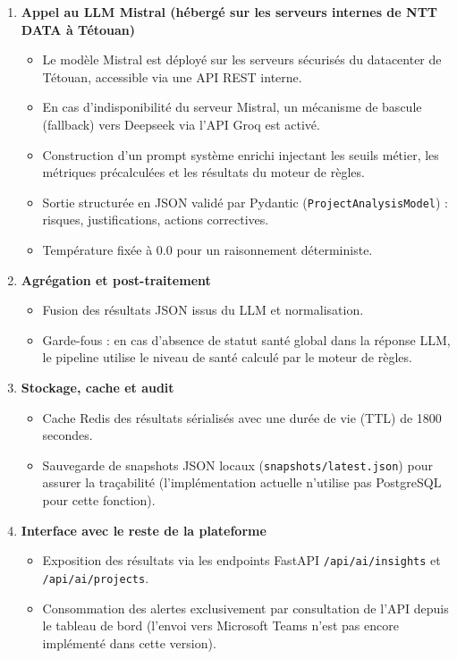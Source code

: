 \begin{enumerate}
    \item \textbf{Appel au LLM Mistral (hébergé sur les serveurs internes de NTT DATA à Tétouan)}
\begin{itemize}
    \renewcommand{\labelitemi}{—}
    \item Le modèle Mistral est déployé sur les serveurs sécurisés du datacenter de Tétouan, accessible via une API REST interne.
    \item En cas d’indisponibilité du serveur Mistral, un mécanisme de bascule (fallback) vers Deepseek via l’API Groq est activé.
    \item Construction d’un prompt système enrichi injectant les seuils métier, les métriques précalculées et les résultats du moteur de règles.
    \item Sortie structurée en JSON validé par Pydantic (\texttt{ProjectAnalysisModel}) : risques, justifications, actions correctives.
    \item Température fixée à $0.0$ pour un raisonnement déterministe.
\end{itemize}
    
    \item \textbf{Agrégation et post-traitement}
    \begin{itemize}
        \renewcommand{\labelitemi}{—}
        \item Fusion des résultats JSON issus du LLM et normalisation.
        \item Garde-fous : en cas d'absence de statut santé global dans la réponse LLM, le pipeline utilise le niveau de santé calculé par le moteur de règles.
    \end{itemize}
    
    \item \textbf{Stockage, cache et audit}
    \begin{itemize}
        \renewcommand{\labelitemi}{—}
        \item Cache Redis des résultats sérialisés avec une durée de vie (TTL) de 1800 secondes.
        \item Sauvegarde de snapshots JSON locaux (\texttt{snapshots/latest.json}) pour assurer la traçabilité (l'implémentation actuelle n'utilise pas PostgreSQL pour cette fonction).
    \end{itemize}
    
    \item \textbf{Interface avec le reste de la plateforme}
    \begin{itemize}
        \renewcommand{\labelitemi}{—}
        \item Exposition des résultats via les endpoints FastAPI \texttt{/api/ai/insights} et \texttt{/api/ai/projects}.
        \item Consommation des alertes exclusivement par consultation de l'API depuis le tableau de bord (l'envoi vers Microsoft Teams n'est pas encore implémenté dans cette version).
    \end{itemize}
\end{enumerate}


